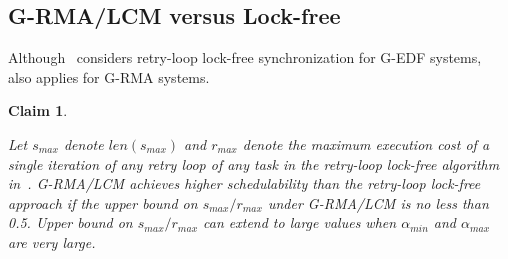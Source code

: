 \documentclass[a4paper,english]{article}
\newtheorem{clm}{Claim}
\begin{document}
\subsection{G-RMA/LCM versus Lock-free}\label{g-rma lcm vs lock-free}

Although~\cite{key-5} considers retry-loop lock-free synchronization
for G-EDF systems,~\cite{key-5} also applies for G-RMA systems.

\begin{clm}\label{lcm rma lock-free comparison clm}

Let $s_{max}$ denote $len(s_{max})$ and $r_{max}$ denote the maximum
execution cost of a single iteration of any retry loop of any task
in the retry-loop lock-free algorithm in~\cite{key-5}. G-RMA/LCM
achieves higher schedulability than the retry-loop lock-free approach
if the upper bound on $s_{max}/r_{max}$ under G-RMA/LCM is no less
than 0.5. Upper bound on $s_{max}/r_{max}$ can extend to large values
when $\alpha_{min}$ and $\alpha_{max}$ are very large.

\end{clm}
\end{document}
